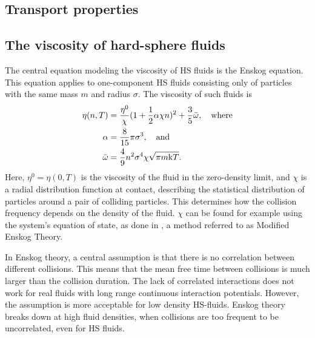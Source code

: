 \subsection{Transport properties}



\subsection{The viscosity of hard-sphere fluids}
The central equation modeling the viscosity of HS fluids is the Enskog equation. This equation applies to one-component HS fluids consisting only of particles with the same mass $m$ and radius $\sigma$.
The viscosity of such fluids is \cite{ref:pippo:composition_dependence}
\begin{equation}
    \begin{split}
        \eta(n,T) 
            &= \frac{\eta^0}{\chi} (1+\frac{1}{2} \alpha \chi n)^2 + \frac{3}{5} \bar{\omega}, \quad \text{where}\\
        \alpha 
            &= \frac{8}{15} \pi \sigma^3, \quad \text{and} \\
        \bar{\omega} 
            &= \frac{4}{9} n^2 \sigma^4 \chi \sqrt{\pi m \mathrm{k} T}.
    \end{split}
\end{equation}
Here, $\eta^0 = \eta(0, T)$ is the viscosity of the fluid in the zero-density limit, 
and $\chi$ is a radial distribution function at contact, 
describing the statistical distribution of particles around a pair of colliding particles.
This determines how the collision frequency depends on the density of the fluid.
$\chi$ can be found for example using the system's equation of state, 
as done in \cite{ref:pippo:composition_dependence}, a method referred to as Modified Enskog Theory.


In Enskog theory, a central assumption is that there is no correlation between different collisions. 
This means that the mean free time between collisions is much larger than the collision duration. 
The lack of correlated interactions does not work for real fluids with long range continuous interaction potentials. 
However, the assumption is more acceptable for low density HS-fluids. 
Enskog theory breaks down at high fluid densities, when collisions are too frequent to be uncorrelated, even for HS fluids.

